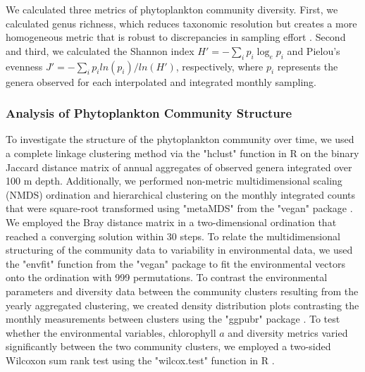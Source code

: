 \documentclass[draft]{agujournal2019}
\begin{document}
    We calculated three metrics of phytoplankton community diversity. First, we calculated genus richness, which reduces taxonomic resolution but creates a more homogeneous metric that is robust to discrepancies in sampling effort \cite{ptacnik_diversity_2008, de2020higher}. Second and third, we calculated the Shannon index $H' = -\sum_i p_i \log_{e} p_i$ and Pielou's evenness $J' = -\sum_i p_i ln( p_i )/ln(H')$, respectively, where $p_i$ represents the genera observed for each interpolated and integrated monthly sampling. 

      
    \subsubsection{Analysis of Phytoplankton Community Structure}
    To investigate the structure of the phytoplankton community over time, we used a complete linkage clustering method via the "hclust" function in R \cite{r_core_team_r_2024} on the binary Jaccard distance matrix of annual aggregates of observed genera integrated over 100 m depth. Additionally, we performed non-metric multidimensional scaling (NMDS) ordination and hierarchical clustering on the monthly integrated counts that were square-root transformed using "metaMDS" from the "vegan" package \cite{oksanen_vegan_2024}. We employed the Bray distance matrix in a two-dimensional ordination that reached a converging solution within 30 steps. To relate the multidimensional structuring of the community data to variability in environmental data, we used the "envfit" function from the "vegan" package to fit the environmental vectors onto the ordination with 999 permutations. 
    To contrast the environmental parameters and diversity data between the community clusters resulting from the yearly aggregated clustering, we created density distribution plots contrasting the monthly measurements between clusters using the "ggpubr" package \cite{kassambara_ggpubr_2023}. To test whether the environmental variables, chlorophyll $a$ and diversity metrics varied significantly between the two community clusters, we employed a two-sided Wilcoxon sum rank test using the "wilcox.test" function in R \cite{r_core_team_r_2024}.

        
\end{document}
